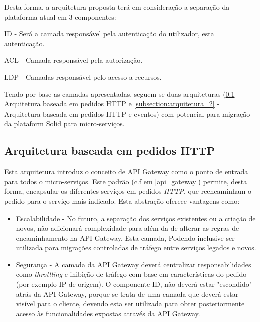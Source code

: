 Desta forma, a arquitetura proposta terá em consideração a separação da plataforma atual em 3 componentes:
\begin{description}
    \item ID -  Será a camada responsável pela autenticação do utilizador, esta autenticação.
    \item ACL - Camada responsável pela autorização.
    \item LDP - Camadas responsável pelo acesso a recursos.
\end{description}


Tendo por base as camadas apresentadas, seguem-se duas arquiteturas (\ref{subsection:arquitetura_1} - Arquitetura baseada em pedidos HTTP e \ref{subsection:arquitetura_2} - Arquitetura baseada em pedidos HTTP e eventos) com potencial para migração da plataform Solid para micro-serviços.

\subsection{Arquitetura baseada em pedidos HTTP} \label{subsection:arquitetura_1}

Esta arquitetura introduz o conceito de API Gateway como o ponto de entrada para todos o micro-serviços. Este padrão (c.f em \ref{api_gateway}) permite, desta forma, encapsular os diferentes serviços em pedidos \emph{HTTP}, que reencaminham o pedido para o serviço mais indicado. Esta abstração oferece vantagens como:

\begin{itemize}
    \item Escalabilidade - No futuro, a separação dos serviços existentes ou a criação de novos, não adicionará complexidade para além da de alterar as regras de encaminhamento na API Gateway. Esta camada, Podendo inclusive ser utilizada para migrações controladas de tráfego entre serviços legados e novos.
    
    \item Segurança - A camada da API Gateway deverá centralizar responsabilidades como \emph{throttling} e inibição de tráfego com base em características do pedido (por exemplo IP de origem). O componente ID, não deverá estar "escondido" atrás da API Gateway, porque se trata de uma camada que deverá estar visível para o cliente, devendo esta ser utilizada para obter posteriormente acesso às funcionalidades expostas através da API Gateway.
\end{itemize}

